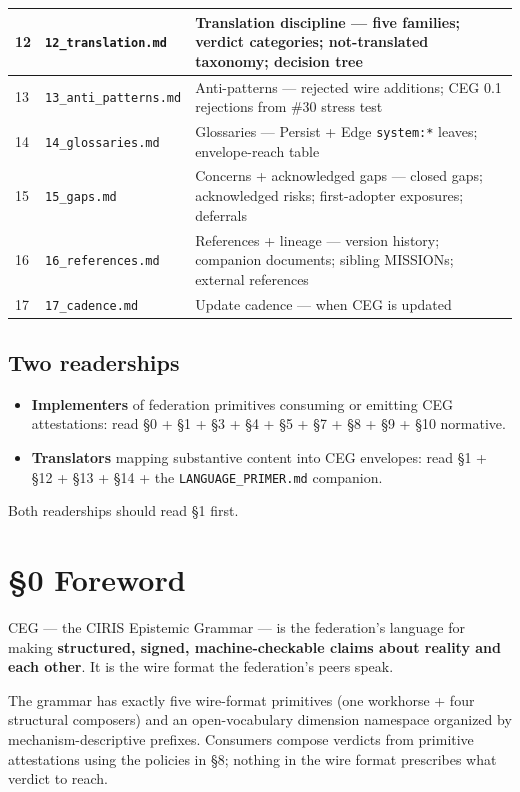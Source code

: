 \documentclass[11pt]{article}
\begin{document}
{\begin{longtable}{|p{5.33cm}|p{5.33cm}|p{5.33cm}|}
12 & \texttt{12\_translation.md} & Translation discipline — five families; verdict categories; not-translated taxonomy; decision tree \\ \hline
13 & \texttt{13\_anti\_patterns.md} & Anti-patterns — rejected wire additions; CEG 0.1 rejections from \#30 stress test \\ \hline
14 & \texttt{14\_glossaries.md} & Glossaries — Persist + Edge \texttt{system:*} leaves; envelope-reach table \\ \hline
15 & \texttt{15\_gaps.md} & Concerns + acknowledged gaps — closed gaps; acknowledged risks; first-adopter exposures; deferrals \\ \hline
16 & \texttt{16\_references.md} & References + lineage — version history; companion documents; sibling MISSIONs; external references \\ \hline
17 & \texttt{17\_cadence.md} & Update cadence — when CEG is updated \\ \hline
\end{longtable}}



\subsection*{Two readerships}


\begin{itemize}\setlength\itemsep{0pt}
\item \textbf{Implementers} of federation primitives consuming or emitting CEG attestations: read §0 + §1 + §3 + §4 + §5 + §7 + §8 + §9 + §10 normative.
\item \textbf{Translators} mapping substantive content into CEG envelopes: read §1 + §12 + §13 + §14 + the \texttt{LANGUAGE\_PRIMER.md} companion.
\end{itemize}


Both readerships should read §1 first.


\clearpage


\section*{§0 Foreword}


CEG — the CIRIS Epistemic Grammar — is the federation's language for making \textbf{structured, signed, machine-checkable claims about reality and each other}. It is the wire format the federation's peers speak.


The grammar has exactly five wire-format primitives (one workhorse + four structural composers) and an open-vocabulary dimension namespace organized by mechanism-descriptive prefixes. Consumers compose verdicts from primitive attestations using the policies in §8; nothing in the wire format prescribes what verdict to reach.
\end{document}
